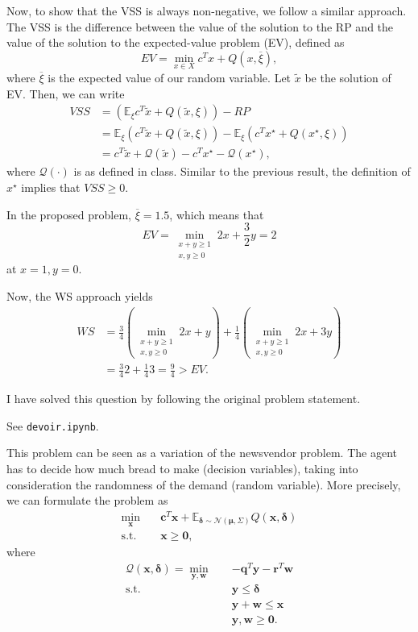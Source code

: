 \documentclass[a4paper]{report}
\begin{document}
Now, to show that the VSS is always non-negative, we follow a similar approach.
The VSS is the difference between the value of the solution to the RP and the value of the solution to the expected-value problem (EV), defined as \[
EV = \min_{x\in X} c^{T}x + Q(x,\overline{\xi} )
,\] where $\overline{\xi}$ is the expected value of our random variable.
Let $\widetilde{x}$ be the solution of EV.
Then, we can write 
\begin{align*}
    VSS &= \left( \mathbb{E}_\xi c^{T}\widetilde{x} + Q(\widetilde{x},\xi) \right) - RP \\
    &= \mathbb{E}_\xi \left( c^{T}\widetilde{x} + Q(\widetilde{x},\xi) \right) - \mathbb{E}_\xi \left( c^{T}x^{\star} + Q(x^{\star},\xi) \right)  \\
    &= c^{T}\widetilde{x} + \mathcal{Q}(\widetilde{x}) - c^{T}x^{\star} - \mathcal{Q}(x^{\star})
,\end{align*}
where $\mathcal{Q}(\cdot )$ is as defined in class.
Similar to the previous result, the definition of $x^{\star}$ implies that $VSS \ge 0$.


In the proposed problem, $\overline{\xi}=1.5$, which means that  \[
    EV = \min_{\substack{x+y \ge 1 \\ x,y \ge 0}} 2x + \frac{3}{2}y = 2
\] at $x=1,y=0$.

Now, the WS approach yields
\begin{align*}
    WS &= \frac{3}{4} \left( \min_{\substack{x+y \ge 1 \\ x,y \ge 0}} 2x + y \right) + \frac{1}{4} \left( \min_{\substack{x+y \ge 1 \\ x,y \ge 0}} 2x + 3y \right) \\
    &= \frac{3}{4}2 + \frac{1}{4}3 = \frac{9}{4} > EV
.\end{align*}


I have solved this question by following the original problem statement.

See \texttt{devoir.ipynb}.



This problem can be seen as a variation of the newsvendor problem.
The agent has to decide how much bread to make (decision variables), taking into consideration the randomness of the demand (random variable).
More precisely, we can formulate the problem as
\begin{align*}
    \min_{\bm{x}} \quad & \bm{c}^{T}\bm{x} + \mathbb{E}_{\bm{\delta}\sim \mathcal{N}(\bm{\mu},\Sigma)} Q(\bm{x},\bm{\delta}) \\
    \textrm{s.t.} \quad & \bm{x} \ge \bm{0}
,\end{align*}
where
\begin{align*}
    \mathcal{Q}(\bm{x}, \bm{\delta}) = \min_{\bm{y}, \bm{w}} \quad & -\bm{q}^{T}\bm{y} - \bm{r}^{T}\bm{w} \\
    \textrm{s.t.} \quad & \bm{y} \le \bm{\delta} \\
      & \bm{y} + \bm{w} \le \bm{x} \\
      & \bm{y}, \bm{w} \ge \bm{0}
.\end{align*}
\end{document}
